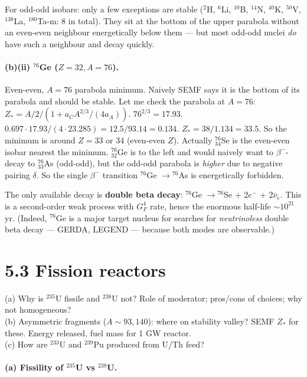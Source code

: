 \documentclass[11pt]{article}
\newcommand{\Q}[1]{\begin{question}#1\end{question}}
\begin{document}
For odd-odd isobars: only a few exceptions are stable ($^{2}$H, $^{6}$Li, $^{10}$B, $^{14}$N, $^{40}$K, $^{50}$V, $^{138}$La, $^{180}$Ta-m: 8 in total). They sit at the bottom of the upper parabola without an even-even neighbour energetically below them — but most odd-odd nuclei \emph{do} have such a neighbour and decay quickly.

\paragraph{(b)(ii) $^{76}$Ge ($Z=32, A=76$).} Even-even, $A=76$ parabola minimum. Naively SEMF says it is the bottom of its parabola and should be stable. Let me check the parabola at $A=76$:
$Z_*=A/2/(1+a_C A^{2/3}/(4a_A))$. $76^{2/3}=17.93$. $0.697\cdot 17.93/(4\cdot 23.285)=12.5/93.14=0.134$. $Z_*=38/1.134=33.5$. So the minimum is around $Z=33$ or 34 (even-even $Z$). Actually $^{76}_{34}$Se is the even-even isobar nearest the minimum. $^{76}_{32}$Ge is to the left and would naively want to $\beta^-$-decay to $^{76}_{33}$As (odd-odd), but the odd-odd parabola is \emph{higher} due to negative pairing $\delta$. So the single $\beta^-$ transition $^{76}$Ge $\to{}^{76}$As is energetically forbidden.

The only available decay is \textbf{double beta decay}: $^{76}$Ge $\to{}^{76}$Se + 2$e^-$ + 2$\bar\nu_e$. This is a second-order weak process with $G_F^{4}$ rate, hence the enormous half-life $\sim 10^{21}$ yr. (Indeed, $^{76}$Ge is a major target nucleus for searches for \emph{neutrinoless} double beta decay --- GERDA, LEGEND --- because both modes are observable.)

\section*{5.3 \quad Fission reactors}

\Q{(a) Why is $^{235}$U fissile and $^{238}$U not? Role of moderator; pros/cons of choices; why not homogeneous?\\
(b) Asymmetric fragments ($A\sim 93,140$): where on stability valley? SEMF $Z_*$ for these. Energy released, fuel mass for 1 GW reactor.\\
(c) How are $^{233}$U and $^{239}$Pu produced from U/Th feed?}

\paragraph{(a) Fissility of $^{235}$U vs $^{238}$U.} 
\end{document}
